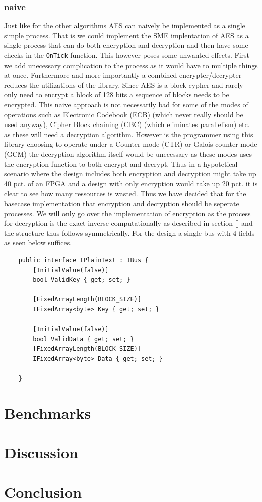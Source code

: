 \documentclass[a4paper]{article}
\begin{document}
\subsubsection{naive}
\label{AESnaive}
Just like for the other algorithms AES can naively be implemented as a single simple process. That is we could implement the SME implentation of AES as a single process that can do both encryption and decryption and then have some checks in the \texttt{OnTick} function. This however poses some unwanted effects. First we add unecessary complication to the process as it would have to multiple things at once. Furthermore and more importantly a combined encrypter/decrypter reduces the utilizations of the library. Since AES is a block cypher and rarely only need to encrypt a block of 128 bits a sequence of blocks needs to be encrypted. This naive approach is not necessarily bad for some of the modes of operations such as Electronic Codebook (ECB) (which never really should be used anyway), Cipher Block chaining (CBC) (which eliminates parallelism) etc. as these will need a decryption algorithm. However is the programmer using this library choosing to operate under a Counter mode (CTR) or Galois-counter mode (GCM) the decryption algorithm itself would be unecessary as these modes uses the encryption function to both encrypt and decrypt. Thus in a hypotetical scenario where the design includes both encryption and decryption might take up 40 pct. of an FPGA and a design with only encryption would take up 20 pct. it is clear to see how many ressources is wasted. Thus we have decided that for the basecase implementation that encryption and decryption should be seperate processes. We will only go over the implementation of encryption as the process for decryption is the exact inverse computationally as described in section \ref{} and the structure thus follows symmetrically. For the design a single bus with 4 fields as seen below suffices.
\begin{verbatim}
    public interface IPlainText : IBus {
        [InitialValue(false)]
        bool ValidKey { get; set; }

        [FixedArrayLength(BLOCK_SIZE)]
        IFixedArray<byte> Key { get; set; }

        [InitialValue(false)]
        bool ValidData { get; set; }
        [FixedArrayLength(BLOCK_SIZE)]
        IFixedArray<byte> Data { get; set; }

    }
\end{verbatim}

\section{Benchmarks}
\label{sec:orgb3ff568}

\section{Discussion}
\label{sec:org567af61}

\section{Conclusion}
\label{sec:orgb9b1384}




\begin{appendix}

\end{appendix}
\end{document}
